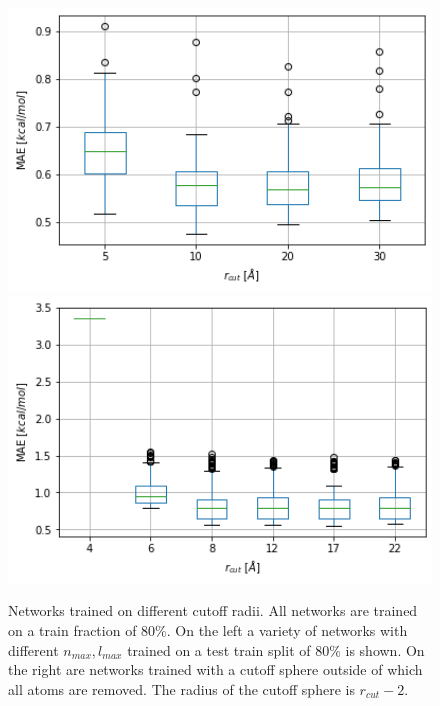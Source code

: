 \begin{figure}[!htb]
    \includegraphics[width=1.0\textwidth]{figures/regression/snap/cut-all.png} %
  \endminipage\hfill
    \includegraphics[width=1.0\textwidth]{figures/regression/snap/cut-sphere.png}
  \endminipage\hfill
  \caption[Comparison of SNAP cutoff radii]{
  Networks trained on different cutoff radii. All networks are trained on a train fraction of 80\%.
  On the left a variety of networks with different $n_{max}, l_{max}$ trained on a test train split of 80\% is shown.
  On the right are networks trained with a cutoff sphere outside of which all atoms are removed. 
  The radius of the cutoff sphere is $r_{cut}-2$.  
 }
  \label{fig:snap_hyperparameter}
\end{figure}


